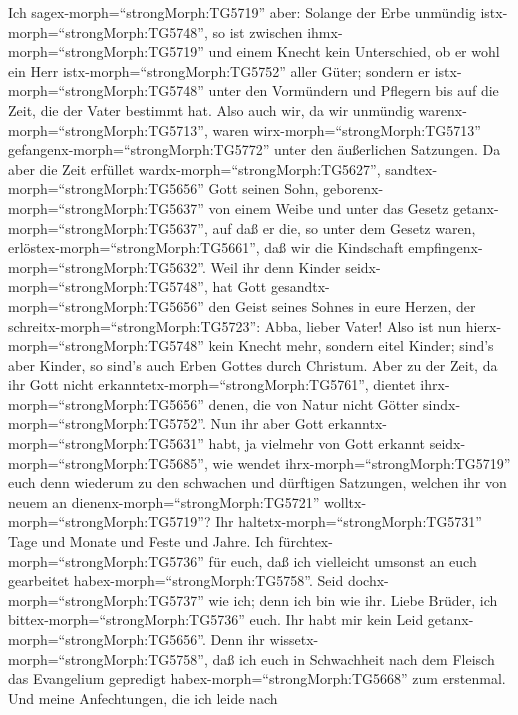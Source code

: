  Ich sagex-morph=``strongMorph:TG5719'' aber: Solange der
Erbe unmündig istx-morph=``strongMorph:TG5748'', so ist zwischen
ihmx-morph=``strongMorph:TG5719'' und einem Knecht kein Unterschied, ob
er wohl ein Herr istx-morph=``strongMorph:TG5752'' aller Güter;
 sondern er istx-morph=``strongMorph:TG5748'' unter den
Vormündern und Pflegern bis auf die Zeit, die der Vater bestimmt hat.
 Also auch wir, da wir unmündig
warenx-morph=``strongMorph:TG5713'', waren
wirx-morph=``strongMorph:TG5713'' gefangenx-morph=``strongMorph:TG5772''
unter den äußerlichen Satzungen.  Da aber die Zeit erfüllet
wardx-morph=``strongMorph:TG5627'', sandtex-morph=``strongMorph:TG5656''
Gott seinen Sohn, geborenx-morph=``strongMorph:TG5637'' von einem Weibe
und unter das Gesetz getanx-morph=``strongMorph:TG5637'', 
auf daß er die, so unter dem Gesetz waren,
erlöstex-morph=``strongMorph:TG5661'', daß wir die Kindschaft
empfingenx-morph=``strongMorph:TG5632''.  Weil ihr denn
Kinder seidx-morph=``strongMorph:TG5748'', hat Gott
gesandtx-morph=``strongMorph:TG5656'' den Geist seines Sohnes in eure
Herzen, der schreitx-morph=``strongMorph:TG5723'': Abba, lieber Vater!
 Also ist nun hierx-morph=``strongMorph:TG5748'' kein Knecht
mehr, sondern eitel Kinder; sind's aber Kinder, so sind's auch Erben
Gottes durch Christum.  Aber zu der Zeit, da ihr Gott nicht
erkanntetx-morph=``strongMorph:TG5761'', dientet
ihrx-morph=``strongMorph:TG5656'' denen, die von Natur nicht Götter
sindx-morph=``strongMorph:TG5752''.  Nun ihr aber Gott
erkanntx-morph=``strongMorph:TG5631'' habt, ja vielmehr von Gott erkannt
seidx-morph=``strongMorph:TG5685'', wie wendet
ihrx-morph=``strongMorph:TG5719'' euch denn wiederum zu den schwachen
und dürftigen Satzungen, welchen ihr von neuem an
dienenx-morph=``strongMorph:TG5721''
wolltx-morph=``strongMorph:TG5719''?  Ihr
haltetx-morph=``strongMorph:TG5731'' Tage und Monate und Feste und
Jahre.  Ich fürchtex-morph=``strongMorph:TG5736'' für euch,
daß ich vielleicht umsonst an euch gearbeitet
habex-morph=``strongMorph:TG5758''.  Seid
dochx-morph=``strongMorph:TG5737'' wie ich; denn ich bin wie ihr. Liebe
Brüder, ich bittex-morph=``strongMorph:TG5736'' euch. Ihr habt mir kein
Leid getanx-morph=``strongMorph:TG5656''.  Denn ihr
wissetx-morph=``strongMorph:TG5758'', daß ich euch in Schwachheit nach
dem Fleisch das Evangelium gepredigt habex-morph=``strongMorph:TG5668''
zum erstenmal.  Und meine Anfechtungen, die ich leide nach
